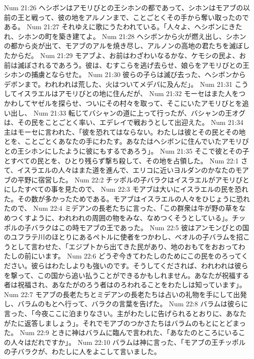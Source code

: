 Num 21:26  ヘシボンはアモリびとの王シホンの都であって、シホンはモアブの以前の王と戦って、彼の地をアルノンまで、ことごとくその手から奪い取ったのである。
Num 21:27  それゆえに歌にうたわれている。「人々よ、ヘシボンにきたれ、シホンの町を築き建てよ。
Num 21:28  ヘシボンから火が燃え出し、シホンの都から炎が出て、モアブのアルを焼き尽し、アルノンの高地の君たちを滅ぼしたからだ。
Num 21:29  モアブよ、お前はわざわいなるかな、ケモシの民よ、お前は滅ぼされるであろう。彼は、むすこらを逃げ去らせ、娘らをアモリびとの王シホンの捕虜とならせた。
Num 21:30  彼らの子らは滅び去った、ヘシボンからデボンまで。われわれは荒した、火はついてメデバに及んだ」。
Num 21:31  こうしてイスラエルはアモリびとの地に住んだが、
Num 21:32  モーセはまた人をつかわしてヤゼルを探らせ、ついにその村々を取って、そこにいたアモリびとを追い出し、
Num 21:33  転じてバシャンの道に上って行ったが、バシャンの王オグは、その民をことごとく率い、エデレイで戦おうとして出迎えた。
Num 21:34  主はモーセに言われた、「彼を恐れてはならない。わたしは彼とその民とその地とを、ことごとくあなたの手にわたす。あなたはヘシボンに住んでいたアモリびとの王シホンにしたように彼にもするであろう」。
Num 21:35  そこで彼とその子とすべての民とを、ひとり残らず撃ち殺して、その地を占領した。
Num 22:1  さて、イスラエルの人々はまた道を進んで、エリコに近いヨルダンのかなたのモアブの平野に宿営した。
Num 22:2  チッポルの子バラクはイスラエルがアモリびとにしたすべての事を見たので、
Num 22:3  モアブは大いにイスラエルの民を恐れた。その数が多かったためである。モアブはイスラエルの人々をひじょうに恐れたので、
Num 22:4  ミデアンの長老たちに言った、「この群衆は牛が野の草をなめつくすように、われわれの周囲の物をみな、なめつくそうとしている」。チッポルの子バラクはこの時モアブの王であった。
Num 22:5  彼はアンモンびとの国のユフラテ川のほとりにあるペトルに使者をつかわし、ベオルの子バラムを招こうとして言わせた、「エジプトから出てきた民があり、地のおもてをおおってわたしの前にいます。
Num 22:6  どうぞ今きてわたしのためにこの民をのろってください。彼らはわたしよりも強いのです。そうしてくだされば、われわれは彼らを撃って、この国から追い払うことができるかもしれません。あなたが祝福する者は祝福され、あなたがのろう者はのろわれることをわたしは知っています」。
Num 22:7  モアブの長老たちとミデアンの長老たちは占いの礼物を手にして出発し、バラムのもとへ行って、バラクの言葉を告げた。
Num 22:8  バラムは彼らに言った、「今夜ここに泊まりなさい。主がわたしに告げられるとおりに、あなたがたに返答しましょう」。それでモアブのつかさたちはバラムのもとにとどまった。
Num 22:9  ときに神はバラムに臨んで言われた、「あなたのところにいるこの人々はだれですか」。
Num 22:10  バラムは神に言った、「モアブの王チッポルの子バラクが、わたしに人をよこして言いました。
